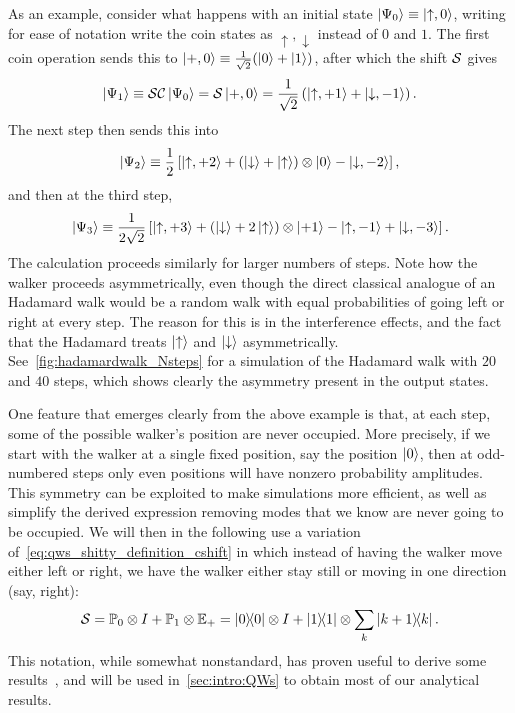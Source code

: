\begin{example}[label=ex:hadamard_walk]
As an example, consider what happens with an initial state $\ket{\Psi_0}\equiv\ket{\uparrow,0}$, writing for ease of notation write the coin states as $\uparrow,\downarrow$ instead of $0$ and $1$.
The first coin operation sends this to $\ket{+,0}\equiv\frac{1}{\sqrt2}(\ket0+\ket1)$, after which the shift ${\mathcal{S}}$ gives
\begin{equation}
    \ket{\Psi_1} \equiv 
    {\mathcal{S}}{\mathcal{C}}\ket{\Psi_0} =
    {\mathcal{S}}\ket{+,0} =
    \frac{1}{\sqrt2} \left( \ket{\uparrow,+1} + \ket{\downarrow, -1} \right).
\end{equation}
The next step then sends this into
\begin{equation}
    \ket{\Psi_2} \equiv
    \frac12\left[
        \ket{\uparrow,+2} +
        (\ket{\downarrow}
        + \ket{\uparrow})\otimes \ket{0}
        - \ket{\downarrow, -2}
    \right],
\end{equation}
and then at the third step,
\begin{equation}
    \ket{\Psi_3} \equiv
    \frac{1}{2\sqrt2}\left[
        \ket{\uparrow,+3} +
        (\ket{\downarrow} + 2\ket{\uparrow})\otimes \ket{+1}
        - \ket{\uparrow,-1}
        + \ket{\downarrow,-3}
    \right].
\end{equation}
The calculation proceeds similarly for larger numbers of steps.
Note how the walker proceeds asymmetrically, even though the direct classical analogue of an Hadamard walk would be a random walk with equal probabilities of going left or right at every step.
The reason for this is in the interference effects, and the fact that the Hadamard treats $\ket\uparrow$ and $\ket\downarrow$ asymmetrically.
See~\cref{fig:hadamardwalk_Nsteps} for a simulation of the Hadamard walk with $20$ and $40$ steps, which shows clearly the asymmetry present in the output states.
\end{example}

One feature that emerges clearly from the above example is that, at each step, some of the possible walker's position are never occupied. More precisely, if we start with the walker at a single fixed position, say the position $\ket0$, then at odd-numbered steps only even positions will have nonzero probability amplitudes.
This symmetry can be exploited to make simulations more efficient, as well as simplify the derived expression removing modes that we know are never going to be occupied.
We will then in the following use a variation of~\cref{eq:qws_shitty_definition_cshift} in which instead of having the walker move either left or right, we have the walker either stay still or moving in one direction (say, right):
\begin{equation}
    {\mathcal{S}} = \mathbb{P}_0\otimes I + \mathbb{P}_1\otimes \mathbb{E}_+
    =\ketbra0\otimes I +\ketbra1\otimes\sum_k\ketbra{k+1}{k}.
\end{equation}
This notation, while somewhat nonstandard, has proven useful to derive some results~\cite{hoyer2009faster,montero2013unidirectional,montero2015quantum}, and will be used in~\cref{sec:intro:QWs} to obtain most of our analytical results.

